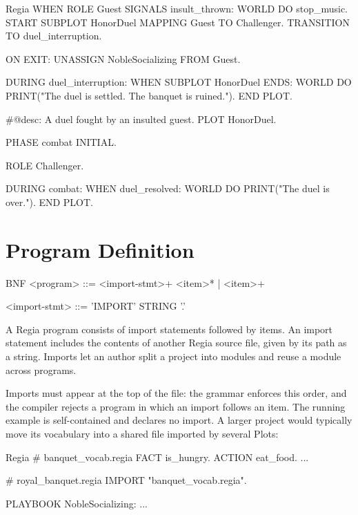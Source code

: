 \begin{codeblock}[]{Regia}
        WHEN ROLE Guest SIGNALS insult_thrown:
            WORLD DO stop_music.
            START SUBPLOT HonorDuel MAPPING Guest TO Challenger.
            TRANSITION TO duel_interruption.
            
        ON EXIT:
            UNASSIGN NobleSocializing FROM Guest.
 
    DURING duel_interruption:
        WHEN SUBPLOT HonorDuel ENDS:
            WORLD DO PRINT("The duel is settled. The banquet is ruined.").
            END PLOT.

#@desc: A duel fought by an insulted guest.
PLOT HonorDuel.
 
    PHASE combat INITIAL.
 
    ROLE Challenger.
 
    DURING combat:
        WHEN duel_resolved:
            WORLD DO PRINT("The duel is over.").
            END PLOT.
 
\end{codeblock}
 
\section{Program Definition}
\label{sec:program-definition}
 
\begin{codeblock}[]{BNF}
    <program>        ::= <import-stmt>+ <item>*
                       | <item>+
    
    <import-stmt>    ::= 'IMPORT' STRING '.'
\end{codeblock}
 
A Regia program consists of import statements followed by items. An import statement includes the contents of another Regia source file, given by its path as a string. Imports let an author split a project into modules and reuse a module across programs.
 
Imports must appear at the top of the file: the grammar enforces this order, and the compiler rejects a program in which an import follows an item. The running example is self-contained and declares no import. A larger project would typically move its vocabulary into a shared file imported by several Plots:
 
\begin{codeblock}[]{Regia}
# banquet_vocab.regia
FACT is_hungry.
ACTION eat_food.
...
 
# royal_banquet.regia
IMPORT "banquet_vocab.regia".
 
PLAYBOOK NobleSocializing:
    ...
\end{codeblock}
 
